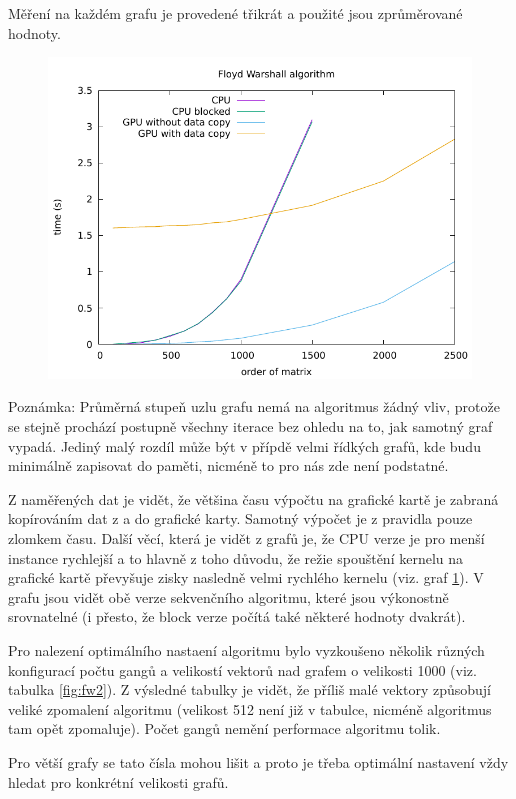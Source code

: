 \documentclass[11pt, fleqn]{article}
\begin{document}
Měření na každém grafu je provedené třikrát a použité jsou zprůměrované hodnoty.

\begin{figure}
  \centering
  \includegraphics[width=.7\linewidth]{../results/Floyd_Warshall.pdf}
  \label{fig:fw1}
\end{figure}

Poznámka: Průměrná stupeň uzlu grafu nemá na algoritmus žádný vliv, protože se stejně prochází postupně všechny iterace bez ohledu na to, jak samotný graf vypadá. Jediný malý rozdíl může být v přípdě velmi řídkých grafů, kde budu minimálně zapisovat do paměti, nicméně to pro nás zde není podstatné.

Z naměřených dat je vidět, že většina času výpočtu na grafické kartě je zabraná kopírováním dat z a do grafické karty. Samotný výpočet je z pravidla pouze zlomkem času. Další věcí, která je vidět z grafů je, že CPU verze je pro menší instance rychlejší a to hlavně z toho důvodu, že režie spouštění kernelu na grafické kartě převyšuje zisky nasledně velmi rychlého kernelu (viz. graf \ref{fig:fw1}). V grafu jsou vidět obě verze sekvenčního algoritmu, které jsou výkonostně srovnatelné (i přesto, že block verze počítá také některé hodnoty dvakrát).

Pro nalezení optimálního nastaení algoritmu bylo vyzkoušeno několik různých konfigurací počtu gangů a velikostí vektorů nad grafem o velikosti 1000 (viz. tabulka \ref{fig:fw2}). Z výsledné tabulky je vidět, že příliš malé vektory způsobují veliké zpomalení algoritmu (velikost 512 není již v tabulce, nicméně algoritmus tam opět zpomaluje). Počet gangů nemění performace algoritmu tolik.

Pro větší grafy se tato čísla mohou lišit a proto je třeba optimální nastavení vždy hledat pro konkrétní velikosti grafů.
\end{document}
